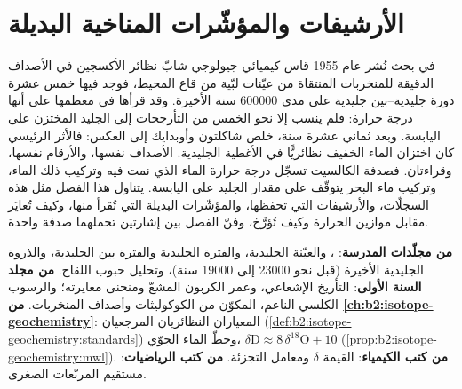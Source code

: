 \chapter{الأرشيفات والمؤشّرات المناخية البديلة}\label{ch:b2:climate-proxies}

في بحث نُشر عام 1955 قاس كيميائي جيولوجي شابّ نظائر الأكسجين في الأصداف الدقيقة
للمنخربات المنتقاة من عيّنات لبّية من قاع المحيط، فوجد فيها خمس عشرة دورة جليدية--بين جليدية على مدى
\num{600000} سنة الأخيرة. وقد قرأها في معظمها على أنها درجة حرارة: فلم ينسب إلا نحو الخمس من
التأرجحات إلى الجليد المختزن على اليابسة. وبعد ثماني عشرة سنة، خلص شاكلتون وأوبدايك إلى
العكس: فالأثر الرئيسي كان اختزان الماء الخفيف نظائريًّا في الأغطية
الجليدية. الأصداف نفسها، والأرقام نفسها، وقراءتان. فصدفة الكالسيت تسجّل
درجة حرارة الماء الذي نمت فيه وتركيب ذلك الماء، وتركيب
ماء البحر يتوقّف على مقدار الجليد على اليابسة. يتناول هذا الفصل مثل هذه السجلّات،
والأرشيفات التي تحفظها، والمؤشّرات البديلة التي تُقرأ منها، وكيف تُعايَر مقابل موازين الحرارة
وكيف تُؤرَّخ، وفنّ الفصل بين إشارتين تحملهما صدفة واحدة.

\begin{recall}
\textbf{من مجلّدات المدرسة}:  ، والعيّنة الجليدية، والفترة الجليدية
والفترة بين الجليدية، والذروة الجليدية الأخيرة (قبل نحو \num{23000} إلى \num{19000} سنة)، وتحليل
حبوب اللقاح. \textbf{من مجلد السنة الأولى}: التأريخ الإشعاعي، وعمر الكربون المشعّ
ومنحنى معايرته؛ والرسوب الكلسي الناعم، المكوّن من الكوكوليثات وأصداف المنخربات.
\textbf{من \cref{ch:b2:isotope-geochemistry}}: المعياران النظائريان المرجعيان  
(\cref{def:b2:isotope-geochemistry:standards}) وخطّ الماء الجوّي، $\delta\mathrm{D}
\approx 8\,\delta^{18}\mathrm{O} + 10$ (\cref{prop:b2:isotope-geochemistry:mwl}). \textbf{من
كتب الكيمياء}: القيمة $\delta$ ومعامل التجزئة. \textbf{من كتب
الرياضيات}: مستقيم المربّعات الصغرى.
\end{recall}

